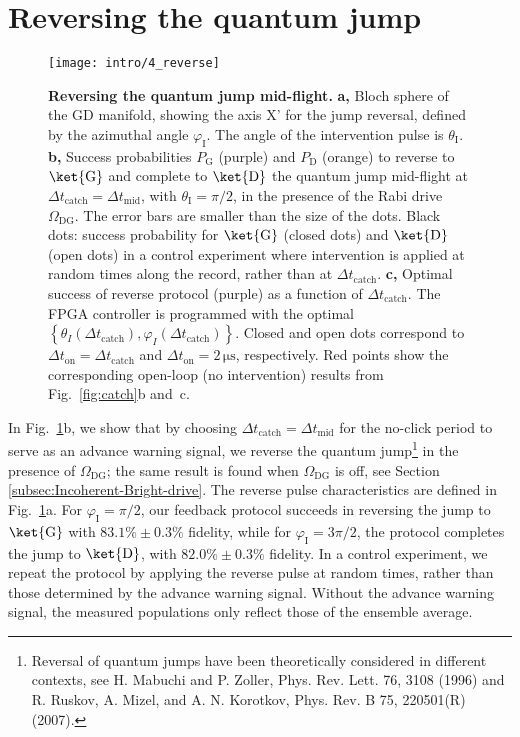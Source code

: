 \section{Reversing the quantum jump\label{sec:Reversing-the-quantum}}

\begin{figure}
\centering{}\texttt{[image: intro/4\_reverse]}
\caption[Reversing the quantum jump mid-flight]{\label{fig:reverse}\textbf{Reversing the quantum jump mid-flight.}
\textbf{a,} Bloch sphere of the GD manifold, showing the axis X' for
the jump reversal, defined by the azimuthal angle $\varphi_{\mathrm{I}}$.
The angle of the intervention pulse is $\theta_{\mathrm{I}}$. \textbf{b,}
Success probabilities $P_{\mathrm{G}}$ (purple) and $P_{\mathrm{D}}$
(orange) to reverse to $\ket{\mathrm{G}}$ and complete to $\ket{\mathrm{D}}$
the quantum jump mid-flight at $\Delta t_{\mathrm{catch}}=\Delta t_{\mathrm{mid}}$,
with $\theta_{\mathrm{I}}=\pi/2$, in the presence of the Rabi drive
$\Omega_{\mathrm{DG}}$. The error bars are smaller than the size
of the dots. Black dots: success probability for $\ket{\mathrm{G}}$
(closed dots) and $\ket{\mathrm{D}}$ (open dots) in a control experiment
where intervention is applied at random times along the record, rather
than at $\Delta t_{\mathrm{catch}}$. \textbf{c,} Optimal success
of reverse protocol (purple) as a function of $\Delta t_{\mathrm{catch}}$.
The FPGA controller is programmed with the optimal $\left\{ \theta_{I}\left(\Delta t_{\mathrm{catch}}\right),\varphi_{I}\left(\Delta t_{\mathrm{catch}}\right)\right\} $.
Closed and open dots correspond to $\Delta t_{\mathrm{on}}=\Delta t_{\mathrm{catch}}$
and $\Delta t_{\mathrm{on}}=2\,\mathrm{\mu s}$, respectively. Red
points show the corresponding open-loop (no intervention) results
from Fig.~\ref{fig:catch}b and~c.}
\end{figure}

In Fig.~\ref{fig:reverse}b, we show that by choosing $\Delta t_{\operatorname{catch}}=\Delta t_{\mathrm{mid}}$
for the no-click period to serve as an advance warning signal, we
reverse the quantum jump\footnote{Reversal of quantum jumps have been theoretically considered in different
contexts, see H. Mabuchi and P. Zoller, Phys. Rev. Lett. 76, 3108
(1996) and R. Ruskov, A. Mizel, and A. N. Korotkov, Phys. Rev. B 75,
220501(R) (2007).} in the presence of $\Omega_{\mathrm{DG}}$; the same result is found
when $\Omega_{\mathrm{DG}}$ is off, see Section \ref{subsec:Incoherent-Bright-drive}.
The reverse pulse characteristics are defined in Fig.~\ref{fig:reverse}a.
For $\varphi_{\mathrm{I}}=\pi/2$, our feedback protocol succeeds
in reversing the jump to $\ket{\mathrm{G}}$ with $83.1\%\pm0.3\%$
fidelity, while for $\varphi_{\mathrm{I}}=3\pi/2$, the protocol completes
the jump to $\ket{\mathrm{D}}$, with $82.0\%\pm0.3\%$ fidelity.
In a control experiment, we repeat the protocol by applying the reverse
pulse at random times, rather than those determined by the advance
warning signal. Without the advance warning signal, the measured populations
only reflect those of the ensemble average.

